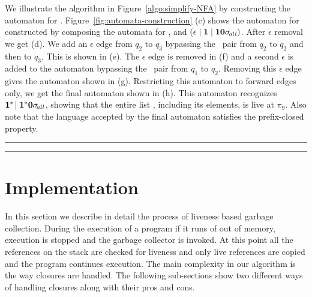 \documentclass[9pt]{sigplanconf}
\newcommand{\comment}[1]{{\color{Myblue}{(#1)}}}
\newcommand{\cred}[1]{{\color{red}{#1}}}
\begin{document}
\comment{change according  to example} We illustrate  the algorithm in
Figure~\ref{algo:simplify-NFA}  by   constructing  the  automaton  for
.   Figure~\ref{fig:automata-construction}  (c) shows
the  automaton  for    constructed by  composing  the
automata   for    ,      and
$(\epsilon \mid \mathbf{1} \mid \mathbf{1}\mathbf{0}\sigma_{\mathit{\!all}})$.  After
$\epsilon$ removal we get (d). We add an $\epsilon$ edge from $q_2$ to
$q_3$ bypassing the  \bcdr\acdr\ pair from $q_2$ to  $q_2$ and then to
$q_3$. This  is shown in (e).   The $\epsilon$ edge is  removed in (f)
and  a second  $\epsilon$  is  added to  the  automaton bypassing  the
\bcar\acar\ pair  from $q_1$ to $q_2$.  Removing  this $\epsilon$ edge
gives  the automaton  shown  in (g).   Restricting  this automaton  to
forward edges  only, we  get the final  automaton shown in  (h).  This
automaton  recognizes  $\mathbf{1}^{*}\!\mid\mathbf{1}^{*}\mathbf{0}  \sigma_{\mathit
  \!all}$, showing  that the entire list \py,  including its elements,
is live at $\pi_9$. Also note  that the language accepted by the final
automaton satisfies the prefix-closed property.


\hrule
\hrule



\section{Implementation}
\cred{Introduction}

In this  section we describe in  detail the process  of liveness based
garbage collection.  During  the execution of a program  if it runs of
out  of memory,  execution is  stopped  and the  garbage collector  is
invoked. At this point all the references on the stack are checked for
liveness and only live references are copied and the program continues
execution.  The main  complexity in our algorithm is  the way closures
are  handled. The  following sub-sections  show two  different  ways of
handling closures along with their pros and cons.
\end{document}
